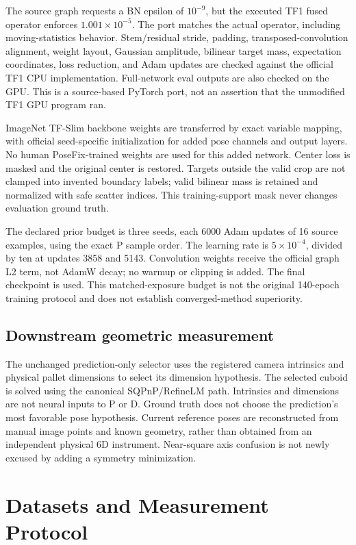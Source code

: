\documentclass[journal]{IEEEtran}
\begin{document}
The source graph requests a BN epsilon of $10^{-9}$, but the executed TF1 fused operator enforces $1.001\times10^{-5}$. The port matches the actual operator, including moving-statistics behavior. Stem/residual stride, padding, transposed-convolution alignment, weight layout, Gaussian amplitude, bilinear target mass, expectation coordinates, loss reduction, and Adam updates are checked against the official TF1 CPU implementation. Full-network eval outputs are also checked on the GPU. This is a source-based PyTorch port, not an assertion that the unmodified TF1 GPU program ran.

ImageNet TF-Slim backbone weights are transferred by exact variable mapping, with official seed-specific initialization for added pose channels and output layers. No human PoseFix-trained weights are used for this added network. Center loss is masked and the original center is restored. Targets outside the valid crop are not clamped into invented boundary labels; valid bilinear mass is retained and normalized with safe scatter indices. This training-support mask never changes evaluation ground truth.

The declared prior budget is three seeds, each 6000 Adam updates of 16 source examples, using the exact P sample order. The learning rate is $5\times10^{-4}$, divided by ten at updates 3858 and 5143. Convolution weights receive the official graph L2 term, not AdamW decay; no warmup or clipping is added. The final checkpoint is used. This matched-exposure budget is not the original 140-epoch training protocol and does not establish converged-method superiority. \PriorTrainingStatus{}

\subsection{Downstream geometric measurement}
The unchanged prediction-only selector uses the registered camera intrinsics and physical pallet dimensions to select its dimension hypothesis. The selected cuboid is solved using the canonical SQPnP/RefineLM path. Intrinsics and dimensions are not neural inputs to P or D. Ground truth does not choose the prediction's most favorable pose hypothesis. Current reference poses are reconstructed from manual image points and known geometry, rather than obtained from an independent physical 6D instrument. Near-square axis confusion is not newly excused by adding a symmetry minimization.

\section{Datasets and Measurement Protocol}
\end{document}
